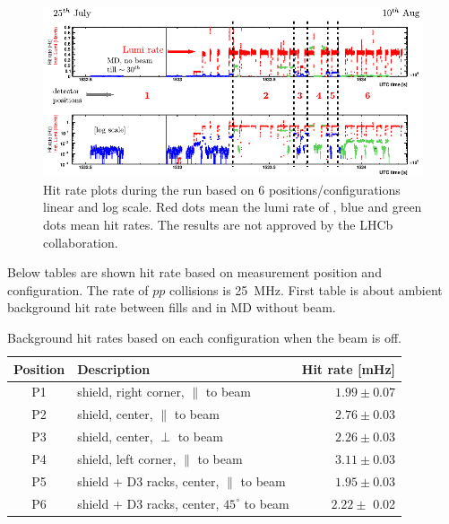 \begin{figure}
\centering
    \includegraphics[width=16cm]{figs/INT/codexb_data_global.pdf}
\caption{
    Hit rate plots during the run based on 6 positions/configurations linear and log scale. Red dots mean the lumi rate of \lhcb, blue and green dots mean hit rates. The results are not approved by the LHCb collaboration.
}
\end{figure}

Below tables are shown hit rate based on measurement position and configuration.
The rate of $pp$ collisions is 25~MHz.
First table is about ambient background hit rate between fills and in MD without beam.

\begin{table}
\begin{center}
\begin{tabular}{c|l|r}
  Position & \hspace{2cm}Description & Hit rate [mHz] \\
  \hline \hline
   P1 & shield, right corner, $\parallel$ to beam& $1.99\pm0.07$ \\ \hline
   P2 & shield, center, $\parallel$ to beam&  $2.76\pm 0.03$ \\ \hline
   P3 & shield, center, $\perp$ to beam& $ 2.26\pm 0.03$ \\ \hline
   P4 & shield, left corner, $\parallel$ to beam& $ 3.11\pm 0.03$ \\ \hline
   P5 & shield + D3 racks, center, $\parallel$ to beam& $ 1.95\pm 0.03$ \\ \hline
   P6 & shield + D3 racks, center, $45^\circ$ to beam& $ 2.22\pm $ 0.02\\ \hline
\end{tabular}
\caption{\label{table:rate_no_beam}
    Background hit rates based on each configuration when the beam is off.
}
\end{center}
\end{table}

